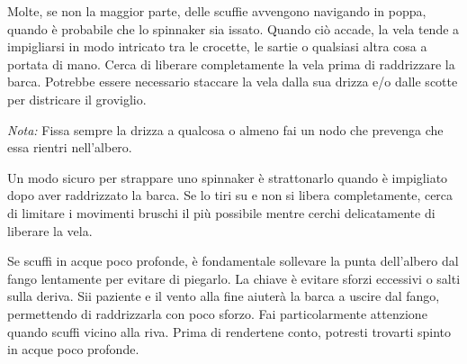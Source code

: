 Molte, se non la maggior parte, delle scuffie avvengono navigando in poppa,
quando è probabile che lo spinnaker sia issato. Quando ciò accade, la vela tende
a impigliarsi in modo intricato tra le crocette, le sartie o qualsiasi altra
cosa a portata di mano. Cerca di liberare completamente la vela prima di
raddrizzare la barca. Potrebbe essere necessario staccare la vela dalla sua
drizza e/o dalle scotte per districare il groviglio.

\emph{Nota:} Fissa sempre la drizza a qualcosa o almeno fai un nodo che prevenga
che essa rientri nell'albero.

Un modo sicuro per strappare uno spinnaker è strattonarlo quando è impigliato
dopo aver raddrizzato la barca. Se lo tiri su e non si libera completamente,
cerca di limitare i movimenti bruschi il più possibile mentre cerchi
delicatamente di liberare la vela.

Se scuffi in acque poco profonde, è fondamentale sollevare la punta dell'albero
dal fango lentamente per evitare di piegarlo. La chiave è evitare sforzi
eccessivi o salti sulla deriva. Sii paziente e il vento alla fine aiuterà la
barca a uscire dal fango, permettendo di raddrizzarla con poco sforzo. Fai
particolarmente attenzione quando scuffi vicino alla riva. Prima di rendertene
conto, potresti trovarti spinto in acque poco profonde.